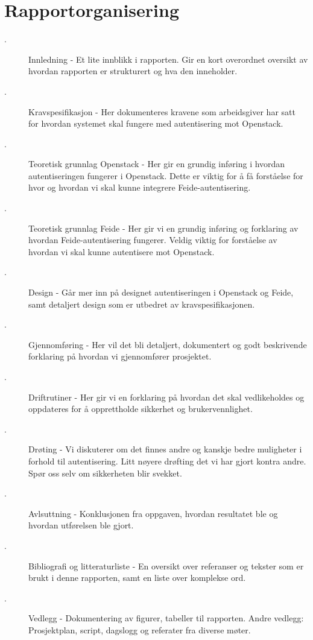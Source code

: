 \section{Rapportorganisering}
\begin{description}
\item[.] Innledning - Et lite innblikk i rapporten. Gir en kort overordnet oversikt av hvordan rapporten er strukturert og hva den inneholder.
\item[.] Kravspesifikasjon - Her dokumenteres kravene som arbeidsgiver har satt for hvordan systemet skal fungere med autentisering mot Openstack.
\item[.] Teoretisk grunnlag Openstack - Her gir en grundig inføring i hvordan autentiseringen fungerer i Openstack. Dette er viktig for å få forståelse for hvor og hvordan vi skal kunne integrere Feide-autentisering.
\item[.] Teoretisk grunnlag Feide - Her gir vi en grundig inføring og forklaring av hvordan Feide-autentisering fungerer. Veldig viktig for forståelse av hvordan vi skal kunne autentisere mot Openstack.
\item[.] Design - Går mer inn på designet autentiseringen i Openstack og Feide, samt detaljert design som er utbedret av kravspesifikasjonen.
\item[.] Gjennomføring - Her vil det bli detaljert, dokumentert og godt beskrivende forklaring på hvordan vi gjennomfører prosjektet. 
\item[.] Driftrutiner - Her gir vi en forklaring på hvordan det skal vedlikeholdes og oppdateres for å opprettholde sikkerhet og brukervennlighet.
\item[.] Drøting - Vi diskuterer om det finnes andre og kanskje bedre muligheter i forhold til autentisering. Litt nøyere drøfting det vi har gjort kontra andre. Spør oss selv om sikkerheten blir svekket. 
\item[.] Avlsuttning - Konklusjonen fra oppgaven, hvordan resultatet ble og hvordan utførelsen ble gjort.
\item[.] Bibliografi og litteraturliste - En oversikt over referanser og tekster som er brukt i denne rapporten, samt en liste over komplekse ord.
\item[.] Vedlegg - Dokumentering av figurer, tabeller til rapporten. Andre vedlegg: Prosjektplan, script, dagslogg og referater fra diverse møter.
\end{description}

\newpage
